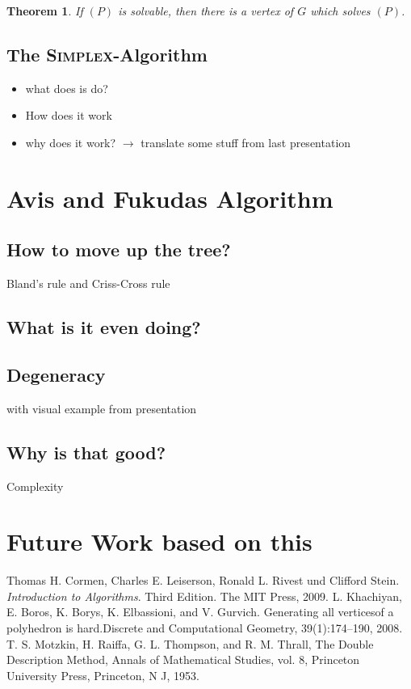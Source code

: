 \documentclass[a4paper, 11pt]{article}
\newtheorem{theorem}{Theorem}
\begin{document}
\begin{theorem}
	If $(P)$ is solvable, then there is a vertex of $G$ which solves $(P)$.
\end{theorem}


\subsection{The \textsc{Simplex}-Algorithm}
\begin{itemize}
	\item what does is do?
	\item How does it work
	\item why does it work? $\rightarrow$ translate some stuff from last presentation
\end{itemize}

\section{Avis and Fukudas Algorithm}
\subsection{How to move up the tree?}
Bland's rule and Criss-Cross rule
\subsection{What is it even doing?}
\subsection{Degeneracy}
with visual example from presentation
\subsection{Why is that good?}
Complexity

\section{Future Work based on this }

\newpage

\begin{thebibliography}{9}
	Thomas H. Cormen, Charles E. Leiserson, Ronald L. Rivest und Clifford Stein.
	\textit{Introduction to Algorithms}. Third Edition. The MIT Press, 2009.
	L. Khachiyan, E. Boros, K. Borys, K. Elbassioni, and V. Gurvich. Generating all
	verticesof a polyhedron is hard.Discrete and Computational Geometry,
	39(1):174–190, 2008.
	T. S. Motzkin, H. Raiffa, G. L. Thompson, and R. M. Thrall, The Double Description Method,
	Annals of Mathematical Studies, vol. 8, Princeton University Press, Princeton, N J, 1953.
\end{thebibliography}
\end{document}

